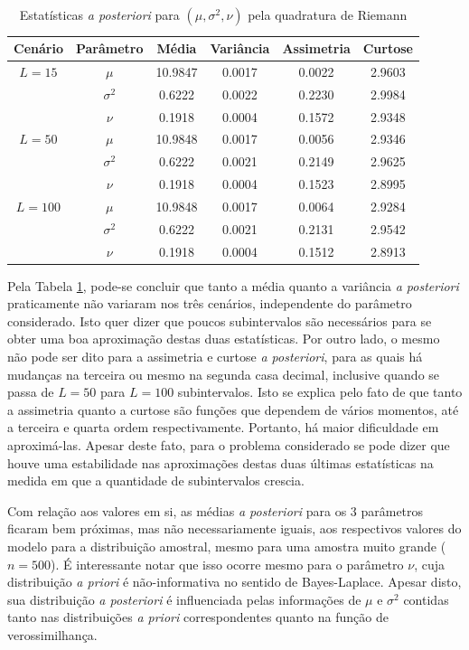 \begin{table}[htb]
	\caption{Estatísticas \textit{a posteriori} para $(\mu, \sigma^2, \nu)$ pela quadratura de Riemann}
	\label{tab1}
	\centering
	\begin{tabular}{cccccc}
		\toprule
		Cenário & Parâmetro & Média & Variância & Assimetria & Curtose \\
		\midrule
		$L = 15$ & $\mu$      & 10.9847 & 0.0017 & 0.0022 & 2.9603 \\
				 & $\sigma^2$ &  0.6222 & 0.0022 & 0.2230 & 2.9984 \\
				 & $\nu$      &  0.1918 & 0.0004 & 0.1572 & 2.9348 \\
		\midrule
		$L = 50$ & $\mu$      & 10.9848 & 0.0017 & 0.0056 & 2.9346 \\
		         & $\sigma^2$ &  0.6222 & 0.0021 & 0.2149 & 2.9625 \\
		         & $\nu$      &  0.1918 & 0.0004 & 0.1523 & 2.8995 \\
		\midrule
		$L = 100$ & $\mu$      & 10.9848 & 0.0017 & 0.0064 & 2.9284 \\
		          & $\sigma^2$ &  0.6222 & 0.0021 & 0.2131 & 2.9542 \\
		          & $\nu$      &  0.1918 & 0.0004 & 0.1512 & 2.8913 \\
		\bottomrule
	\end{tabular}
\end{table}

Pela Tabela \ref{tab1}, pode-se concluir que tanto a média quanto a variância \textit{a posteriori} praticamente não variaram nos três cenários, independente do parâmetro considerado. Isto quer dizer que poucos subintervalos são necessários para se obter uma boa aproximação destas duas estatísticas. Por outro lado, o mesmo não pode ser dito para a assimetria e curtose \textit{a posteriori}, para as quais há mudanças na terceira ou mesmo na segunda casa decimal, inclusive quando se passa de $L = 50$ para $L = 100$ subintervalos. Isto se explica pelo fato de que tanto a assimetria quanto a curtose são funções que dependem de vários momentos, até a terceira e quarta ordem respectivamente. Portanto, há maior dificuldade em aproximá-las. Apesar deste fato, para o problema considerado se pode dizer que houve uma estabilidade nas aproximações destas duas últimas estatísticas na medida em que a quantidade de subintervalos crescia.

Com relação aos valores em si, as médias \textit{a posteriori} para os 3 parâmetros ficaram bem próximas, mas não necessariamente iguais, aos respectivos valores do modelo para a distribuição amostral, mesmo para uma amostra muito grande ($n = 500$). É interessante notar que isso ocorre mesmo para o parâmetro $\nu$, cuja distribuição \textit{a priori} é não-informativa no sentido de Bayes-Laplace. Apesar disto, sua distribuição \textit{a posteriori} é influenciada pelas informações de $\mu$ e $\sigma^2$ contidas tanto nas distribuições \textit{a priori} correspondentes quanto na função de verossimilhança.

